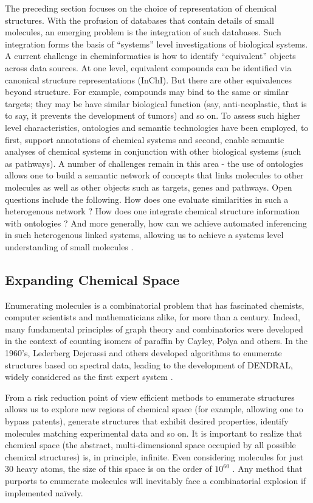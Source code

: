 \documentclass{sig-alternate}
\begin{document}
The preceding section focuses on the choice of representation of
chemical structures. With the profusion of databases that contain
details of small molecules, an emerging problem is the integration of
such databases. Such integration forms the basis of ``systems'' level
investigations of biological systems. A current challenge in
cheminformatics is how to identify ``equivalent'' objects across data
sources. At one level, equivalent compounds can be identified via
canonical structure representations (InChI). But there are other
equivalences beyond structure. For example, compounds may bind to the
same or similar targets; they may be have similar biological function
(say, anti-neoplastic, that is to say, it prevents the development of tumors) and so on. To assess such higher level
characteristics, ontologies and semantic technologies have been
employed, to first, support annotations of chemical systems and
second, enable semantic analyses of chemical systems in conjunction
with other biological systems (such as pathways). A number of
challenges remain in this area - the use of ontologies allows one to
build a semantic network of concepts that links molecules to other
molecules as well as other objects such as targets, genes and
pathways. Open questions include the following.  How does one evaluate similarities in such a heterogenous
network \cite{couto2010}? How does one integrate chemical structure
information with ontologies \cite{hastingsowled2010}? And more
generally, how can we achieve automated inferencing in such
heterogenous linked systems, allowing us to achieve a systems level
understanding of small molecules \cite{Oprea:2007fk}.

\subsection{Expanding Chemical Space}
\label{sec:struct-enum}
Enumerating molecules is a combinatorial problem that has fascinated
chemists, computer scientists and mathematicians alike, for more than
a century. Indeed, many fundamental principles of graph theory and
combinatorics were developed in the context of counting isomers of
paraffin by Cayley, Polya and others. In the 1960's, Lederberg
Dejerassi and others developed algorithms to enumerate structures
based on spectral data, leading to the development of DENDRAL, widely
considered as the first expert system \cite{DENDRAL}.

From a risk reduction point of view efficient methods to enumerate
structures allows us to explore new regions of chemical space (for
example, allowing one to bypass patents), generate structures that
exhibit desired properties, identify molecules matching experimental
data and so on. It is important to realize that chemical space (the
abstract, multi-dimensional space occupied by all possible chemical
structures) is, in principle, infinite. Even considering molecules for
just 30 heavy atoms, the size of this space is on the order of
$10^{60}$ \cite{Bohacek:1996ve}. Any method that purports to enumerate
molecules will inevitably face a combinatorial explosion if
implemented na\"{i}vely.
\end{document}
